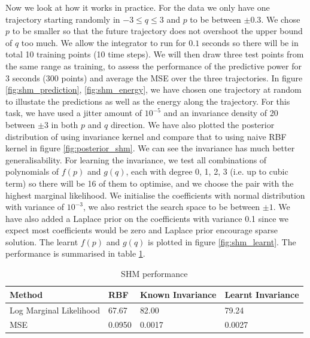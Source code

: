 \documentclass{statsmsc}
\begin{document}
Now we look at how it works in practice.
For the data we only have one trajectory starting randomly in $-3\le q\le3$ and $p$ to be between $\pm 0.3$.
We chose $p$ to be smaller so that the future trajectory does not overshoot the upper bound of $q$ too much. 
We allow the integrator to run for $0.1$ seconds so there will be in total 10 training points (10 time steps). 
We will then draw three test points from the same range as training, to assess the performance of the predictive power for 3 seconds (300 points) and average the MSE over the three trajectories. 
In figure \ref{fig:shm_prediction}, \ref{fig:shm_energy}, we have chosen one trajectory at random to illustate the predictions as well as the energy along the trajectory.
For this task, we have used a jitter amount of $10^{-5}$ and an invariance density of 20 between $\pm 3$ in both $p$ and $q$ direction.
We have also plotted the posterior distribution of using invariance kernel and compare that to using naive RBF kernel in figure \ref{fig:posterior_shm}.
We can see the invariance has much better generalisability.
For learning the invariance, we test all combinations of polynomials of $f(p)$ and $g(q)$, each with degree 0, 1, 2, 3 (i.e. up to cubic term) so there will be 16 of them to optimise, and we choose the pair with the highest marginal likelihood. 
We initialise the coefficients with normal distribution with variance of $10^{-3}$, we also restrict the search space to be between $\pm 1$.
We have also added a Laplace prior on the coefficients with variance 0.1 since we expect most coefficients would be zero and Laplace prior encourage sparse solution.
The learnt $f(p)$ and $g(q)$ is plotted in figure \ref{fig:shm_learnt}.
The performance is summarised in table \ref{tab:shm_performance}.

\begin{table}[H]
  \centering
  \begin{tabular}{l l l l }
\hline
Method           & RBF & Known Invariance&  Learnt Invariance\\
  \hline
Log Marginal Likelihood & 67.67 & 82.00 & 79.24 \\
MSE & 0.0950 & 0.0017 & 0.0027 \\
                    \hline
  \end{tabular}
  \caption{SHM performance}
  \label{tab:shm_performance}
\end{table}
\end{document}
